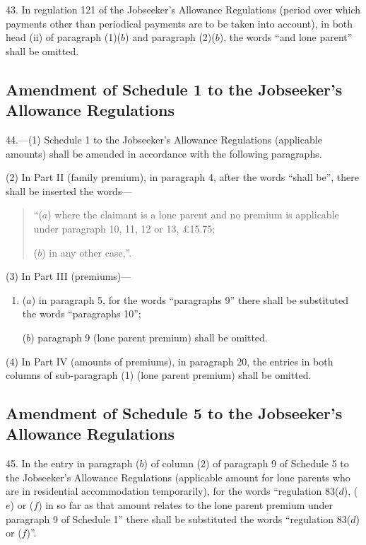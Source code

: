 \documentclass[12pt,a4paper]{article}
\begin{document}
43.  In regulation 121 of the Jobseeker’s Allowance Regulations (period over which payments other than periodical payments are to be taken into account), in both head (ii) of paragraph (1)($b$) and paragraph (2)($b$), the words “and lone parent” shall be omitted.

\subsection[44. Amendment of Schedule 1 to the Jobseeker’s Allowance Regulations]{Amendment of Schedule 1 to the Jobseeker’s Allowance Regulations}

44.—(1) Schedule 1 to the Jobseeker’s Allowance Regulations (applicable amounts) shall be amended in accordance with the following paragraphs.

(2) In Part II (family premium), in paragraph 4, after the words “shall be”, there shall be inserted the words—
\begin{quotation}
“($a$) where the claimant is a lone parent and no premium is applicable under paragraph 10, 11, 12 or 13, £15.75;

($b$) in any other case,”.
\end{quotation}

(3) In Part III (premiums)—
\begin{enumerate}\item[]
($a$) in paragraph 5, for the words “paragraphs 9” there shall be substituted the words “paragraphs 10”;

($b$) paragraph 9 (lone parent premium) shall be omitted.
\end{enumerate}

(4) In Part IV (amounts of premiums), in paragraph 20, the entries in both columns of sub-paragraph (1) (lone parent premium) shall be omitted.

\subsection[45. Amendment of Schedule 5 to the Jobseeker’s Allowance Regulations]{Amendment of Schedule 5 to the Jobseeker’s Allowance Regulations}

45.  In the entry in paragraph ($b$) of column (2) of paragraph 9 of Schedule 5 to the Jobseeker’s Allowance Regulations (applicable amount for lone parents who are in residential accommodation temporarily), for the words “regulation 83($d$), ($e$) or ($f$) in so far as that amount relates to the lone parent premium under paragraph 9 of Schedule 1” there shall be substituted the words “regulation 83($d$) or ($f$)”.
\end{document}
